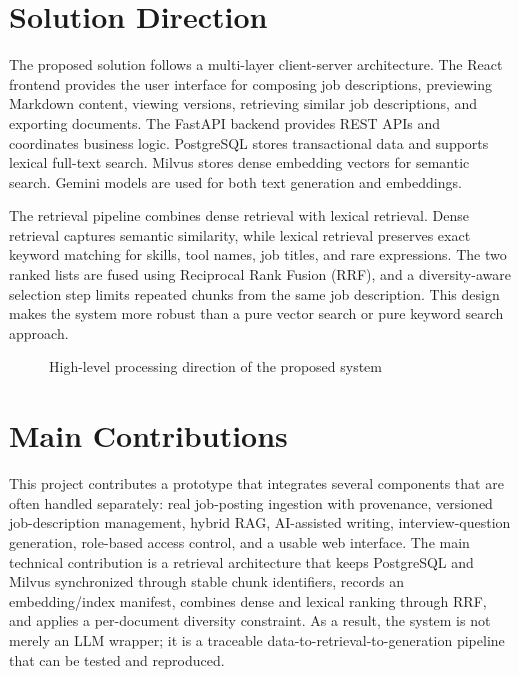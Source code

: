 \documentclass[12pt,a4paper,oneside]{report}
\begin{document}
\section{Solution Direction}
The proposed solution follows a multi-layer client-server architecture. The React frontend provides the user interface for composing job descriptions, previewing Markdown content, viewing versions, retrieving similar job descriptions, and exporting documents. The FastAPI backend provides REST APIs and coordinates business logic. PostgreSQL stores transactional data and supports lexical full-text search. Milvus stores dense embedding vectors for semantic search. Gemini models are used for both text generation and embeddings.

The retrieval pipeline combines dense retrieval with lexical retrieval. Dense retrieval captures semantic similarity, while lexical retrieval preserves exact keyword matching for skills, tool names, job titles, and rare expressions. The two ranked lists are fused using Reciprocal Rank Fusion (RRF), and a diversity-aware selection step limits repeated chunks from the same job description. This design makes the system more robust than a pure vector search or pure keyword search approach.

\begin{figure}[H]
\centering
{}
\caption{High-level processing direction of the proposed system}
\label{fig:overview-flow}
\end{figure}

\section{Main Contributions}
This project contributes a prototype that integrates several components that are often handled separately: real job-posting ingestion with provenance, versioned job-description management, hybrid RAG, AI-assisted writing, interview-question generation, role-based access control, and a usable web interface. The main technical contribution is a retrieval architecture that keeps PostgreSQL and Milvus synchronized through stable chunk identifiers, records an embedding/index manifest, combines dense and lexical ranking through RRF, and applies a per-document diversity constraint. As a result, the system is not merely an LLM wrapper; it is a traceable data-to-retrieval-to-generation pipeline that can be tested and reproduced.
\end{document}
